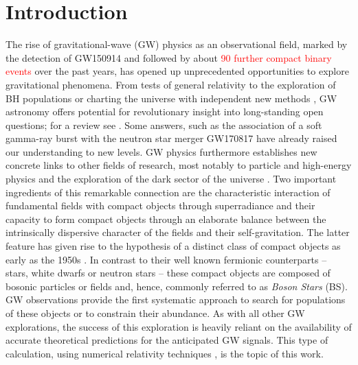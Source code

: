 \documentclass[]{iopart}
\newcommand{\new}[1]{\textcolor{red}{#1}}
\begin{document}
\maketitle

\section{Introduction}
\label{sec:intro}

The rise of gravitational-wave (GW) physics as an observational
field, marked by the detection of GW150914 \cite{Abbott:2016blz}
and followed by about \new{90 further compact binary events
\cite{LIGOScientific:2018mvr,LIGOScientific:2020ibl,LIGOScientific:2021djp}}
over the past
years, has opened up unprecedented opportunities to explore
gravitational phenomena. From tests of general relativity
\cite{Berti:2015itd,TheLIGOScientific:2016src,Abbott:2018lct,LIGOScientific:2019fpa,LIGOScientific:2020tif,Moore:2021eok}
to the exploration of BH populations
\cite{Trifiro:2015zda,Belczynski:2017gds,LIGOScientific:2020kqk,Baibhav:2020xdf,Gerosa:2021mno}
or charting the universe with independent new methods
\cite{LIGOScientific:2017adf,LIGOScientific:2019zcs}, GW astronomy
offers potential for revolutionary insight into long-standing open
questions; for a review see \cite{Barack:2018yly}. Some answers,
such as the association of a soft gamma-ray burst with the neutron
star merger GW170817 \cite{TheLIGOScientific:2017qsa,Monitor:2017mdv}
have already raised our understanding to new levels. GW physics
furthermore establishes new concrete links to other fields of
research, most notably to particle and high-energy physics and the
exploration of the dark sector of the universe
\cite{Cardoso:2014uka,Barack:2018yly}. Two important ingredients
of this remarkable connection are the characteristic interaction
of fundamental fields with compact objects through superradiance
\cite{Brito:2015oca} and their capacity to form compact objects
through an elaborate balance between the intrinsically dispersive
character of the fields and their self-gravitation. The latter
feature has given rise to the hypothesis of a distinct class of
compact objects as early as the 1950s \cite{Wheeler:1955zz}. In
contrast to their well known fermionic counterparts -- stars, white
dwarfs or neutron stars -- these compact objects are composed of
bosonic particles or fields and, hence, commonly referred to as
{\em Boson Stars} (BS). GW observations provide the first systematic
approach to search for populations of these objects or to constrain
their abundance. As with all other GW explorations, the success of
this exploration is heavily reliant on the availability of accurate
theoretical predictions for the anticipated GW signals.  This type
of calculation, using numerical relativity techniques
\cite{Baumgarte:2021skc}, is the topic of this work.
\end{document}
